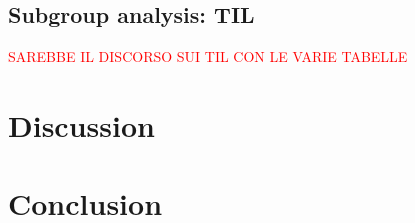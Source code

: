 \subsection{Subgroup analysis: TIL}
\textcolor{red}{SAREBBE IL DISCORSO SUI TIL CON LE VARIE TABELLE}

\section{Discussion}

\section{Conclusion}






